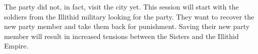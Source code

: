The party did not, in fact, visit the city yet.
This session will start with the soldiers from the Illithid military looking for the party.
They want to recover the new party member and take them back for punishment.
Saving their new party member will result in increased tensions between the Sisters and the Illithid Empire.
